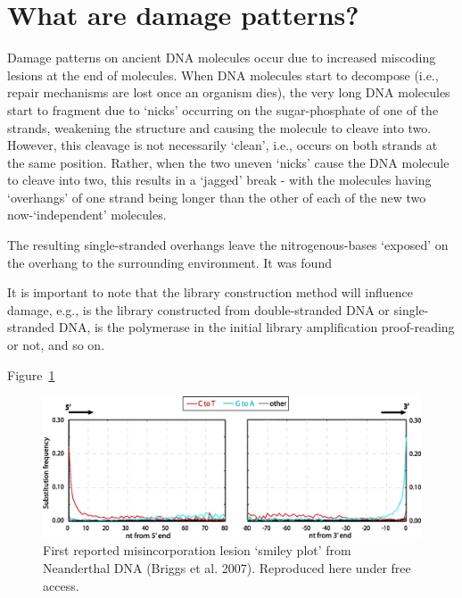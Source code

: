 \documentclass[
  letterpaper,
  DIV=11,
  numbers=noendperiod]{scrreprt}
\begin{document}

\hypertarget{what-are-damage-patterns}{%
\section*{What are damage patterns?}\label{what-are-damage-patterns}}


Damage patterns on ancient DNA molecules occur due to increased
miscoding lesions at the end of molecules. When DNA molecules start to
decompose (i.e., repair mechanisms are lost once an organism dies), the
very long DNA molecules start to fragment due to `nicks' occurring on
the sugar-phosphate of one of the strands, weakening the structure and
causing the molecule to cleave into two. However, this cleavage is not
necessarily `clean', i.e., occurs on both strands at the same position.
Rather, when the two uneven `nicks' cause the DNA molecule to cleave
into two, this results in a `jagged' break - with the molecules having
`overhangs' of one strand being longer than the other of each of the new
two now-`independent' molecules.

The resulting single-stranded overhangs leave the nitrogenous-bases
`exposed' on the overhang to the surrounding environment. It was found

It is important to note that the library construction method will
influence damage, e.g., is the library constructed from double-stranded
DNA or single-stranded DNA, is the polymerase in the initial library
amplification proof-reading or not, and so on.

Figure~\ref{fig-briggs-2007}

\begin{figure}

{\centering \includegraphics{assets/images/briggs_2007_original_Damage_pattern.jpeg}

}

\caption{\label{fig-briggs-2007}First reported misincorporation lesion
`smiley plot' from Neanderthal DNA (Briggs et al. 2007). Reproduced here
under free access.}

\end{figure}
\end{document}
